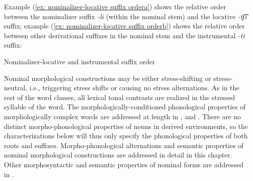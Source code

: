 Example (\ref{ex: nominalizer-locative suffix ordera}) shows the relative order between the nominalizer suffix \textit{-li} (with\-in the nominal stem) and the locative \textit{-tʃ͡i} suffix; example (\ref{ex: nominalizer-locative suffix orderb}) shows the relative order between other derivational suffixes in the nominal stem and the instrumental \textit{-ti} suffix:

\ea\label{ex: nominalizer-locative suffix order}
{Nominalizer-locative and instrumental suffix order}

    \label{ex: nominalizer-locative suffix ordera}
        \label{ex: nominalizer-locative suffix orderb}
    \z
\z


Nominal morphological constructions may be either stress-shifting or stress-neu\-tral, i.e., triggering stress shifts or causing no stress alternations. As in the rest of the word classes, all lexical tonal contrasts are realized in the stressed syllable of the word. The morphologically-conditioned phonological properties of morphologically complex words are addressed at length in ,  and . There are no distinct morpho-phonological properties of nouns in derived environments, so the characterizations below will thus only specify the phonological properties of both roots and suffixes. Morpho-pho\-nological alternations and semantic properties of nominal morphological constructions are addressed in detail in this chapter. Other morphosyntactic and semantic properties of nominal forms are addressed in .


